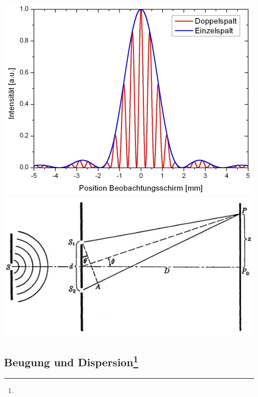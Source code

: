 \documentclass[12pt,a4paper]{article}
\renewcommand{\=}[1]{\stackrel{#1}{=}}
\theoremstyle{definition}
\theoremstyle{remark}
\begin{document}
\begin{center}
\begin{minipage}[t]{.6\linewidth}
\end{minipage}%
\begin{minipage}[t]{.4\linewidth}
\vspace{0pt}
\includegraphics[width=\linewidth]{pic/interferenz.jpg}
\vspace{20px}
\includegraphics[width=0.9\linewidth]{pic/young.png}
\end{minipage}
\end{center}

\subsection[Beugung und Dispersion]{Beugung und Dispersion\let\thefootnote\relax\footnote{}}
\end{document}
